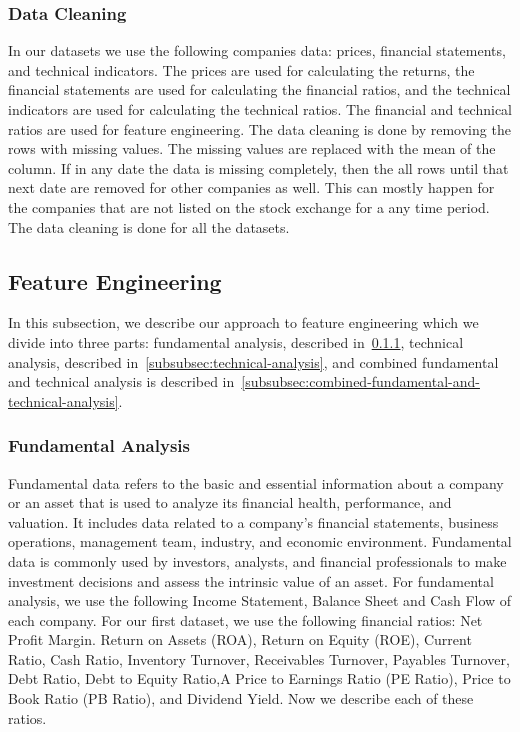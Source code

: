 \documentclass[../xlapes02]{subfiles}
\begin{document}
    \subsubsection{Data Cleaning}\label{subsubsec:data-cleaning}
    In our datasets we use the following companies data: prices, financial statements, and technical indicators. The prices are used for calculating the returns, the financial statements are used for calculating the financial ratios, and the technical indicators are used for calculating the technical ratios. The financial and technical ratios are used for feature engineering. The data cleaning is done by removing the rows with missing values. The missing values are replaced with the mean of the column. If in any date the data is missing completely, then the all rows until that next date are removed for other companies as well. This can mostly happen for the companies that are not listed on the stock exchange for a any time period. The data cleaning is done for all the datasets.

    \subsection{Feature Engineering}\label{subsubsec:feature-engineering}
    In this subsection, we describe our approach to feature engineering which we divide into three parts: fundamental analysis, described in~\cref{subsubsec:fundamental-analysis}, technical analysis, described in~\cref{subsubsec:technical-analysis}, and combined fundamental and technical analysis is described in~\cref{subsubsec:combined-fundamental-and-technical-analysis}.

    \subsubsection{Fundamental Analysis}\label{subsubsec:fundamental-analysis}
    Fundamental data refers to the basic and essential information about a company or an asset that is used to analyze its financial health, performance, and valuation. It includes data related to a company's financial statements, business operations, management team, industry, and economic environment. Fundamental data is commonly used by investors, analysts, and financial professionals to make investment decisions and assess the intrinsic value of an asset. For fundamental analysis, we use the following Income Statement, Balance Sheet and Cash Flow of each company. For our first dataset, we use the following financial ratios: Net Profit Margin. Return on Assets (ROA), Return on Equity (ROE), Current Ratio, Cash Ratio, Inventory Turnover, Receivables Turnover, Payables Turnover, Debt Ratio, Debt to Equity Ratio,A Price to Earnings Ratio (PE Ratio), Price to Book Ratio (PB Ratio), and Dividend Yield. Now we describe each of these ratios.
\end{document}
